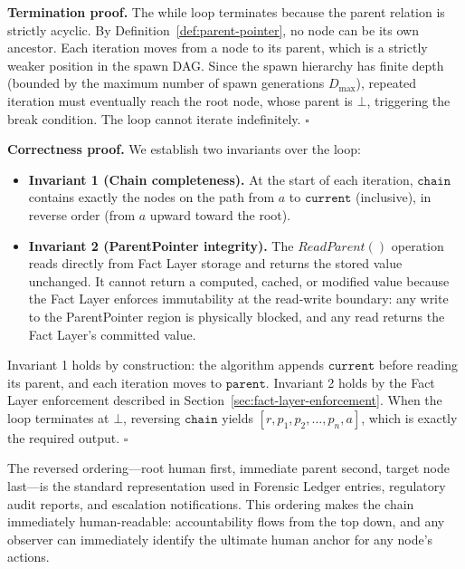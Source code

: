 \noindent\textbf{Termination proof.} The while loop terminates because the parent relation is strictly acyclic. By Definition~\ref{def:parent-pointer}, no node can be its own ancestor. Each iteration moves from a node to its parent, which is a strictly weaker position in the spawn DAG. Since the spawn hierarchy has finite depth (bounded by the maximum number of spawn generations $D_{\max}$), repeated iteration must eventually reach the root node, whose parent is $\bot$, triggering the break condition. The loop cannot iterate indefinitely. \hfill $\square$

\noindent\textbf{Correctness proof.} We establish two invariants over the loop:

\begin{itemize}[noitemsep]
    \item \textbf{Invariant 1 (Chain completeness).} At the start of each iteration, $\texttt{chain}$ contains exactly the nodes on the path from $a$ to $\texttt{current}$ (inclusive), in reverse order (from $a$ upward toward the root).

    \item \textbf{Invariant 2 (ParentPointer integrity).} The $\textit{ReadParent}()$ operation reads directly from Fact Layer storage and returns the stored value unchanged. It cannot return a computed, cached, or modified value because the Fact Layer enforces immutability at the read-write boundary: any write to the ParentPointer region is physically blocked, and any read returns the Fact Layer's committed value.
\end{itemize}

Invariant 1 holds by construction: the algorithm appends $\texttt{current}$ before reading its parent, and each iteration moves to $\texttt{parent}$. Invariant 2 holds by the Fact Layer enforcement described in Section~\ref{sec:fact-layer-enforcement}. When the loop terminates at $\bot$, reversing $\texttt{chain}$ yields $[r, p_1, p_2, \dots, p_n, a]$, which is exactly the required output. \hfill $\square$

The reversed ordering—root human first, immediate parent second, target node last—is the standard representation used in Forensic Ledger entries, regulatory audit reports, and escalation notifications. This ordering makes the chain immediately human-readable: accountability flows from the top down, and any observer can immediately identify the ultimate human anchor for any node's actions.

